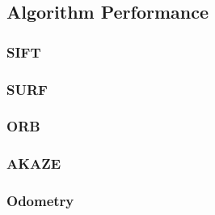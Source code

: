 \subsection{Algorithm Performance}

\subsubsection{SIFT}


\subsubsection{SURF}


\subsubsection{ORB}


\subsubsection{AKAZE}


\subsubsection{Odometry}

